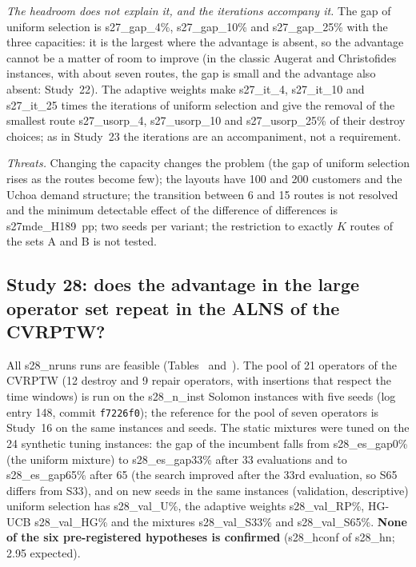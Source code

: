 \emph{The headroom does not explain it, and the iterations accompany it.} The gap of uniform selection is \num{s27_gap_4}\%, \num{s27_gap_10}\% and \num{s27_gap_25}\% with the three capacities: it is the largest where the advantage is absent, so the advantage cannot be a matter of room to improve (in the classic Augerat and Christofides instances, with about seven routes, the gap is small and the advantage also absent: Study~22). The adaptive weights make \num{s27_it_4}, \num{s27_it_10} and \num{s27_it_25} times the iterations of uniform selection and give the removal of the smallest route \num{s27_usorp_4}, \num{s27_usorp_10} and \num{s27_usorp_25}\% of their destroy choices; as in Study~23 the iterations are an accompaniment, not a requirement.

\emph{Threats.} Changing the capacity changes the problem (the gap of uniform selection rises as the routes become few); the layouts have 100 and 200 customers and the Uchoa demand structure; the transition between 6 and 15 routes is not resolved and the minimum detectable effect of the difference of differences is \num{s27mde_H189}~pp; two seeds per variant; the restriction to exactly $K$ routes of the sets A and B is not tested.




\subsection{Study 28: does the advantage in the large operator set repeat in the ALNS of the CVRPTW?}\label{sec:s28}
All \num{s28_nruns} runs are feasible (Tables~ and~). The pool of 21 operators of the CVRPTW (12 destroy and 9 repair operators, with insertions that respect the time windows) is run on the \num{s28_n_inst} Solomon instances with five seeds (log entry 148, commit \texttt{f7226f0}); the reference for the pool of seven operators is Study~16 on the same instances and seeds. The static mixtures were tuned on the 24 synthetic tuning instances: the gap of the incumbent falls from \num{s28_es_gap0}\% (the uniform mixture) to \num{s28_es_gap33}\% after 33 evaluations and to \num{s28_es_gap65}\% after 65 (the search improved after the 33rd evaluation, so S65 differs from S33), and on new seeds in the same instances (validation, descriptive) uniform selection has \num{s28_val_U}\%, the adaptive weights \num{s28_val_RP}\%, HG-UCB \num{s28_val_HG}\% and the mixtures \num{s28_val_S33}\% and \num{s28_val_S65}\%. \textbf{None of the six pre-registered hypotheses is confirmed} (\num{s28_hconf} of \num{s28_hn}; 2.95 expected).

